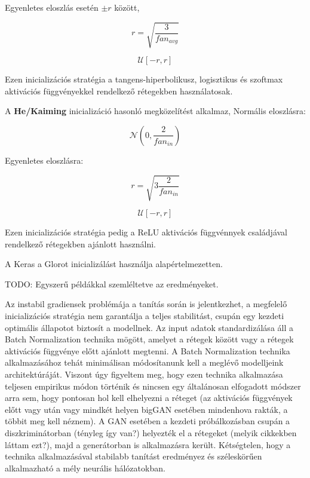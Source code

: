 Egyenletes eloszlás esetén $\pm r$ között,

$$r = \sqrt{\frac{3}{fan_{avg}}}$$

$$ \mathcal{U}\left[-r, r\right] $$

Ezen inicializációs stratégia a tangens-hiperbolikusz, logisztikus és szoftmax aktivációs függvényekkel rendelkező rétegekben használatosak. 


A \textbf{He/Kaiming} inicializáció hasonló megközelítést alkalmaz,
Normális eloszlásra:

$$ \mathcal{N}(0, \frac{2}{fan_{in}}) $$

Egyenletes eloszlásra:

$$r = \sqrt{3\frac{2}{fan_{in}}}$$

$$ \mathcal{U}\left[-r, r\right] $$

Ezen inicializációs stratégia pedig a ReLU aktivációs függvénnyek családjával rendelkező rétegekben ajánlott használni.


A Keras a Glorot inicializálást használja alapértelmezetten.


TODO: Egyszerű példákkal szemléltetve az eredményeket.



Az instabil gradiensek problémája a tanítás során is jelentkezhet, a megfelelő inicializációs stratégia nem garantálja a teljes stabilitást, csupán egy kezdeti optimális állapotot biztosít a modellnek.
Az input adatok standardizálása áll a Batch Normalization technika mögött, amelyet a rétegek között vagy a rétegek aktivációs függvénye előtt ajánlott megtenni. A Batch Normalization technika alkalmazásához tehát minimálisan módosítanunk kell a meglévő modelljeink architektúráját. Viszont úgy figyeltem meg, hogy ezen technika alkalmazása teljesen empirikus módon történik és nincsen egy általánosan elfogadott módszer arra sem, hogy pontosan hol kell elhelyezni a réteget (az aktivációs függvények előtt vagy után vagy mindkét helyen bigGAN esetében mindenhova rakták, a többit meg kell néznem). A GAN esetében a kezdeti próbálkozásban csupán a diszkriminátorban (tényleg így van?) helyezték el a rétegeket (melyik cikkekben láttam ezt?), majd a generátorban is alkalmazásra került. Kétségtelen, hogy a technika alkalmazásával stabilabb tanítást eredményez és széleskörűen alkalmazható a mély neurális hálózatokban.

